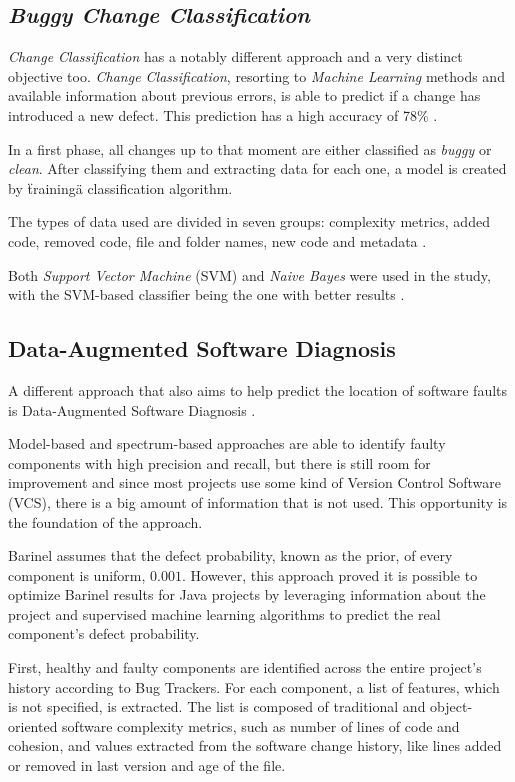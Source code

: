 \subsection{\emph{Buggy Change Classification}}

\emph{Change Classification} has a notably different approach and a very distinct objective too. \emph{Change Classification}, resorting to \emph{Machine Learning} methods and available information about previous errors, is able to predict if a change has introduced a new defect. This prediction has a high accuracy of 78\% \cite{Whitehead2008}.

In a first phase, all changes up to that moment are either classified as \emph{buggy} or \emph{clean}. After classifying them and extracting data for each one, a model is created by \"training\" a classification algorithm.

The types of data used are divided in seven groups: complexity metrics, added code, removed code, file and folder names, new code and metadata \cite{Whitehead2008}.

Both \emph{Support Vector Machine} (SVM) and \emph{Naive Bayes} were used in the study, with the SVM-based classifier being the one with better results \cite{Whitehead2008}.

\subsection{Data-Augmented Software Diagnosis} \label{subsec:elmishali}

A different approach that also aims to help predict the location of software faults is Data-Augmented Software Diagnosis \cite{Elmishali}.

Model-based and spectrum-based approaches are able to identify faulty components with high precision and recall, but there is still room for improvement and since most projects use some kind of Version Control Software (VCS), there is a big amount of information that is not used. This opportunity is the foundation of the approach.

Barinel assumes that the defect probability, known as the prior, of every component is uniform, $0.001$. However, this approach proved it is possible to optimize Barinel results for Java projects by leveraging information about the project and supervised machine learning algorithms to predict the real component's defect probability.

First, healthy and faulty components are identified across the entire project's history according to Bug Trackers. For each component, a list of features, which is not specified, is extracted. The list is composed of traditional and object-oriented software complexity metrics, such as number of lines of code and cohesion, and values extracted from the software change history, like lines added or removed in last version and age of the file.

